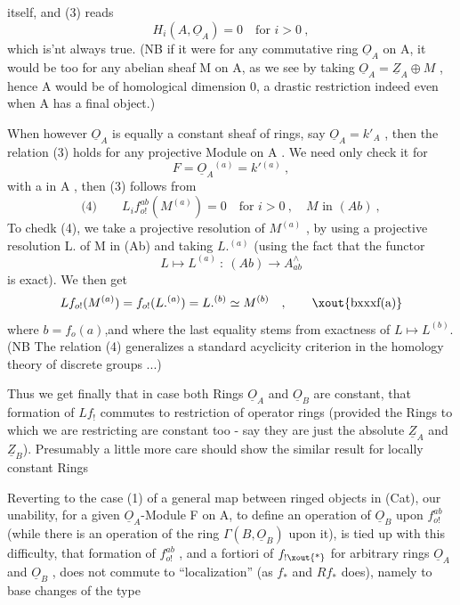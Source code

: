 itself,  and (3) reads
\[ H_i(A,\underline{O}_A)= 0 \quad \text{for } i>0 \ , \]
which is'nt always true.  (NB if it were for any commutative ring $\underline{O}_A$
on A,  it would be too for any abelian sheaf M on A,  as we see by 
taking  $\underline{O}_A = \underline{Z}_A \oplus M$ ,  hence A would be of homological dimension 0,
a drastic restriction indeed  even when A has a final object.)

When however $\underline{O}_A$ is equally a constant sheaf of rings,  
say  $\underline{O}_A = k'_A$ ,  then the relation (3) holds for any projective Module
on A .  We need only check it for
\[ F = \underline{O}_A{}^{(a)} = k'{}^{(a)} \ , \]
with a in A ,  then (3) follows from
\[ \text{(4)} \qquad L_i f^{ab}_{o!}(M^{(a)}) = 0 \quad \text{for } i>0 \ , \quad M \text{ in } (Ab) \ , \]
To chedk (4),  we take a projective resolution of $M^{(a)}$ ,  by using a
projective resolution L. of M in (Ab) and taking  $L.^{(a)}$  (using the
fact that the functor
\[ L \mapsto L^{(a)} \ : \ (Ab) \to A^{\wedge}_{ab} \]
is exact).  We then get
\[ Lf_{o!}(M^{(a)}) = f_{o!}(L.^{(a)}) = L.^{(b)} \simeq M^{(b)} \quad , \qquad \text{\xout{bxxxf(a)}} \]
where $b=f_o(a)$,and where the last equality stems from exactness of $L\mapsto L^{(b)}$.
(NB  The relation (4) generalizes a standard acyclicity criterion in
the homology theory of discrete groups ...)

Thus we get finally that in case both Rings $\underline{O}_A$ and $\underline{O}_B$ are constant,
that formation of $Lf_!$  commutes to restriction of operator rings
(provided the Rings to which we are restricting are constant too  -
say they are just the absolute $\underline{Z}_A$ and $\underline{Z}_B$).  Presumably a little more
care should show the similar result for locally constant Rings 

Reverting to the case (1) of a general map between ringed objects
in (Cat),  our unability,  for a given $\underline{O}_A$-Module F on A,  to define an
operation of $\underline{O}_B$ upon $f^{ab}_{o!}$  (while there is an operation of the ring
$\Gamma(B,\underline{O}_B)$ upon it),  is tied up with this difficulty,  that formation
of  $f^{ab}_{o!}$ ,  and a fortiori of $f_{!\text{\xout{*}}}$ for arbitrary rings $\underline{O}_A$ and $\underline{O}_B$ , does
not commute to ``localization'' (as $f_*$ and $Rf_*$ does),  namely to base
changes of the type

